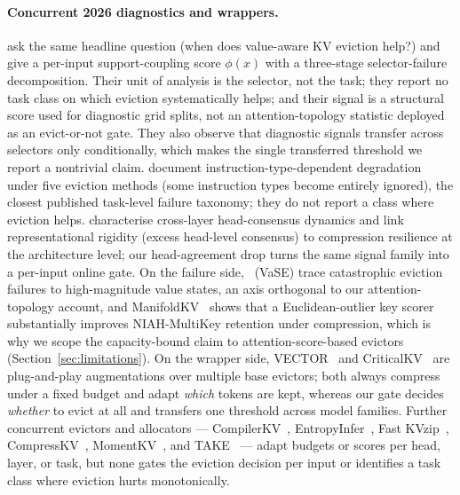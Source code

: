 \documentclass{article} %
\begin{document}
\paragraph{Concurrent 2026 diagnostics and wrappers.}
\citet{arxiv260508234} ask the same headline question (when does value-aware
KV eviction help?) and give a per-input support-coupling score $\phi(x)$ with
a three-stage selector-failure decomposition. Their unit of analysis is the
selector, not the task; they report no task class on which eviction
systematically helps; and their signal is a structural score used for
diagnostic grid splits, not an attention-topology statistic deployed as an
evict-or-not gate. They also observe that diagnostic signals transfer across
selectors only conditionally, which makes the single transferred threshold we
report a nontrivial claim. \citet{arxiv251000231} document
instruction-type-dependent degradation under five eviction methods (some
instruction types become entirely ignored), the closest published task-level
failure taxonomy; they do not report a class where eviction helps.
\citet{arxiv260301426} characterise cross-layer head-consensus dynamics and
link representational rigidity (excess head-level consensus) to compression
resilience at the architecture level; our head-agreement drop turns the same
signal family into a per-input online gate. On the failure side,
\citet{arxiv260603928}~(VaSE) trace catastrophic eviction failures to
high-magnitude value states, an axis orthogonal to our attention-topology
account, and ManifoldKV~\citep{arxiv260208343} shows that a Euclidean-outlier
key scorer substantially improves NIAH-MultiKey retention under compression,
which is why we scope the capacity-bound claim to attention-score-based
evictors (Section~\ref{sec:limitations}). On the wrapper side,
VECTOR~\citep{arxiv260523258} and CriticalKV~\citep{arxiv250203805} are
plug-and-play augmentations over multiple base evictors; both always compress
under a fixed budget and adapt \emph{which} tokens are kept, whereas our gate
decides \emph{whether} to evict at all and transfers one threshold across
model families. Further concurrent evictors and allocators ---
CompilerKV~\citep{arxiv260208686}, EntropyInfer~\citep{arxiv260609508},
Fast KVzip~\citep{arxiv260117668}, CompressKV~\citep{arxiv260624467},
MomentKV~\citep{arxiv260601563}, and TAKE~\citep{take-openreview} --- adapt
budgets or scores per head, layer, or task, but none gates the eviction
decision per input or identifies a task class where eviction hurts
monotonically.
\end{document}

